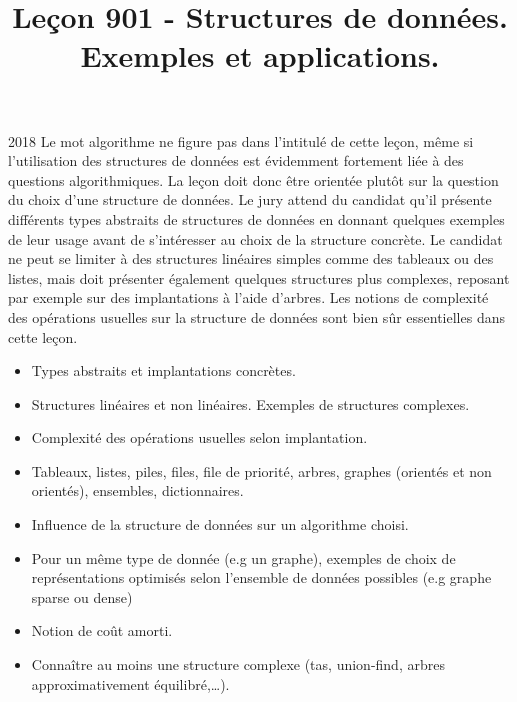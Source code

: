 \documentclass{agregfiche}
\title{Leçon 901 - Structures de données. Exemples et applications.}
\begin{document}
\maketitle

\secrapports
\begin{rapport}{2018}
	Le mot algorithme ne figure pas dans l’intitulé de cette leçon, même si l’utilisation des structures de
	données est évidemment fortement liée à des questions algorithmiques. La leçon doit donc être orientée
	plutôt sur la question du choix d’une structure de données. Le jury attend du candidat qu’il présente
	différents types abstraits de structures de données en donnant quelques exemples de leur usage avant de
	s’intéresser au choix de la structure concrète. Le candidat ne peut se limiter à des structures linéaires
	simples comme des tableaux ou des listes, mais doit présenter également quelques structures plus
	complexes, reposant par exemple sur des implantations à l’aide d’arbres. Les notions de complexité des
	opérations usuelles sur la structure de données sont bien sûr essentielles dans cette leçon.
\end{rapport}

\secindispensables

\begin{itemize}
	\item  Types abstraits et implantations concrètes.
    \item Structures linéaires et non linéaires. Exemples de structures complexes.
	\item Complexité des opérations usuelles selon implantation.
\end{itemize}

\secasavoir

\begin{itemize}
    \item  Tableaux, listes, piles, files, file de priorité, arbres, graphes (orientés et non orientés), ensembles, dictionnaires.
    \item Influence de la structure de données sur un algorithme choisi.
    \item Pour un même type de donnée (e.g un graphe), exemples de choix de représentations optimisés selon l'ensemble de données possibles (e.g graphe sparse ou dense)
    \item Notion de coût amorti.
    \item Connaître au moins une structure complexe (tas, union-find, arbres approximativement équilibré,\dots).

\end{itemize}
\end{document}
